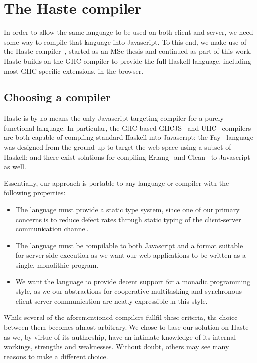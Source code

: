 \documentclass[preprint]{sigplanconf}
\begin{document}
\section{The Haste compiler}\label{sec:haste}

In order to allow the same language to be used on both client and server, we
need some way to compile that language into Javascript. To this end, we make
use of the Haste compiler\ \cite{haste}, started as an MSc thesis and continued
as part of this work. Haste builds on the GHC compiler to provide the full
Haskell language, including most GHC-specific extensions, in the browser.

\subsection{Choosing a compiler}

Haste is by no means the only Javascript-targeting compiler for a purely
functional language. In particular, the GHC-based GHCJS\ \cite{ghcjs} and
UHC\ \cite{uhc} compilers are both capable of compiling standard Haskell into
Javascript; the Fay\ \cite{fay} language was designed from the ground up to
target the web space using a subset of Haskell; and there exist solutions for
compiling Erlang\ \cite{jserlang} and Clean\ \cite{jsclean} to Javascript as
well.

Essentially, our approach is portable to any language or compiler with the
following properties:

\begin{itemize}
  \item The language must provide a static type system, since one of our
        primary concerns is to reduce defect rates through static typing of
        the client-server communication channel.
  \item The language must be compilable to both Javascript and a format
        suitable for server-side execution as we want our web applications
        to be written as a single, monolithic program.
  \item We want the language to provide decent support for a monadic
        programming style, as we our abstractions for cooperative multitasking
        and synchronous client-server communication are neatly expressible in
        this style.
\end{itemize}

While several of the aforementioned compilers fullfil these criteria, the
choice between them becomes almost arbitrary. We chose to base our solution on
Haste as we, by virtue of its authorship, have an intimate knowledge of its
internal workings, strengths and weaknesses. Without doubt, others may see many
reasons to make a different choice.
\end{document}
